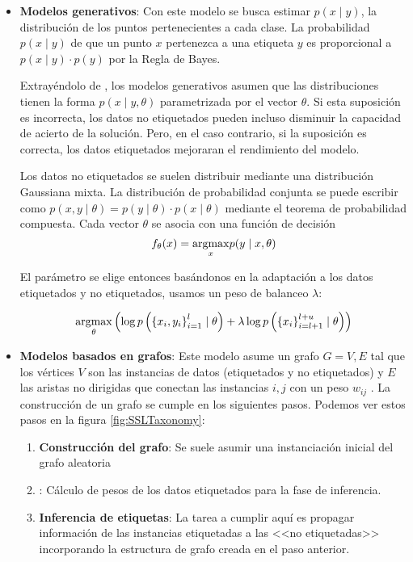 \begin{itemize}
  \item \textbf{Modelos generativos}: Con este modelo se busca estimar $p(x \mid y)$, la distribución de los puntos pertenecientes a cada clase. La probabilidad $p(x \mid y)$ de que un punto $x$ pertenezca a una etiqueta $y$ es proporcional a $p(x \mid y) \cdot p(y)$ por la Regla de Bayes.

        Extrayéndolo de , los modelos generativos asumen que las distribuciones tienen la forma $p(x \mid y, \theta)$ parametrizada por el vector $\theta$. Si esta suposición es incorrecta, los datos no etiquetados pueden incluso disminuir la capacidad de acierto de la solución. Pero, en el caso contrario, si la suposición es correcta, los datos etiquetados mejoraran el rendimiento del modelo.

        Los datos no etiquetados se suelen distribuir mediante una distribución Gaussiana mixta. La distribución de probabilidad conjunta se puede escribir como $p(x,y \mid \theta) = p(y \mid \theta) \cdot p(x \mid \theta)$ mediante el teorema de probabilidad compuesta. Cada vector $\theta$ se asocia con una función de decisión \[f_{\theta}(x) = \underset{x}{\operatorname{argmax}} p(y \mid x, \theta)\]

        El parámetro se elige entonces basándonos en la adaptación a los datos etiquetados y no etiquetados, usamos un peso de balanceo $\lambda$:

        \begin{equation*}
          \underset{\theta}{\operatorname{argmax}} \left( \log p\left(\left\{x_i, y_i\right\}_{i=1}^{l} \mid \theta\right)+\lambda \log p\left(\left\{x_i\right\}_{i=l+1}^{l+u} \mid \theta \right) \right)
        \end{equation*}

  \item \textbf{Modelos basados en grafos}: Este modelo asume un grafo $G = {V,E}$ tal que los vértices $V$ son las instancias de datos (etiquetados y no etiquetados) y $E$ las aristas no dirigidas que conectan las instancias $i,j$ con un peso $w_{ij}$ . La construcción de un grafo se cumple en los siguientes pasos. Podemos ver estos pasos en la figura \ref{fig:SSLTaxonomy}:
        \begin{enumerate}
          \item \textbf{Construcción del grafo}: Se suele asumir una instanciación inicial del grafo aleatoria
          \item \textbf{}: Cálculo de pesos de los datos etiquetados para la fase de inferencia.
          \item \textbf{Inferencia de etiquetas}: La tarea a cumplir aquí es propagar información de las instancias etiquetadas a las <<no etiquetadas>> incorporando la estructura de grafo creada en el paso anterior.
        \end{enumerate}
\end{itemize}

